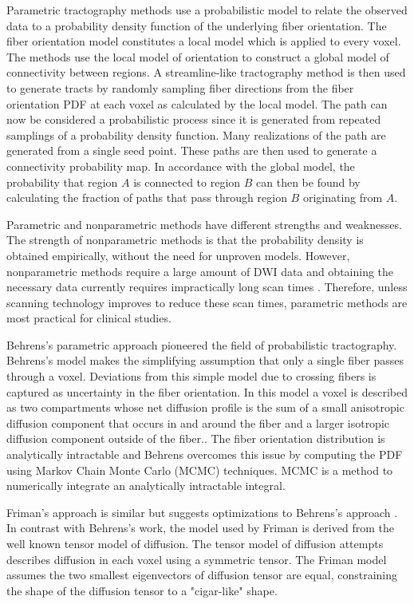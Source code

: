 Parametric tractography methods use a probabilistic model to relate the observed data to a probability density function of the underlying fiber orientation.  The fiber orientation model constitutes a local model which is applied to every voxel.  The methods use the local model of orientation to construct a global model of connectivity between regions.  A streamline-like tractography method is then used to generate tracts by randomly sampling fiber directions from the fiber orientation PDF at each voxel as calculated by the local model.  The path can now be considered a probabilistic process since it is generated from repeated samplings of a probability density function.  Many realizations of the path are generated from a single seed point.  These paths are then used to generate a connectivity probability map.  In accordance with the global model, the probability that region $A$ is connected to region $B$ can then be found by calculating the fraction of paths that pass through region $B$ originating from $A$.

Parametric and nonparametric methods have different strengths and weaknesses.  The strength of nonparametric methods is that the probability density is obtained empirically, without the need for unproven models.  However, nonparametric methods require a large amount of DWI data and obtaining the necessary data currently requires impractically long scan times \cite{derek}.  Therefore, unless scanning technology improves to reduce these scan times, parametric methods are most practical for clinical studies.

Behrens's parametric approach pioneered the field of probabilistic tractography\cite{behrensMRM03}. Behrens's model makes the simplifying assumption that only a single fiber passes through a voxel.  Deviations from this simple model due to crossing fibers is captured as uncertainty in the fiber orientation.  In this model a voxel is described as two compartments whose net diffusion profile is the sum of a small anisotropic diffusion component that occurs in and around the fiber and a larger isotropic diffusion component outside of the fiber.\cite{behrensMRM03}.  The fiber orientation distribution is analytically intractable and Behrens overcomes this issue by computing the PDF using Markov Chain Monte Carlo (MCMC) techniques.  MCMC is a method to numerically integrate an analytically intractable integral.  

Friman's approach is similar but suggests optimizations to Behrens's approach \cite{frimanTMI06}.  In contrast with Behrens's work, the model used by Friman is derived from the well known tensor model of diffusion.  The tensor model of diffusion attempts describes diffusion in each voxel using a symmetric tensor.  The Friman model assumes the two smallest eigenvectors of diffusion tensor are equal, constraining the shape of the diffusion tensor to a "cigar-like" shape. 


